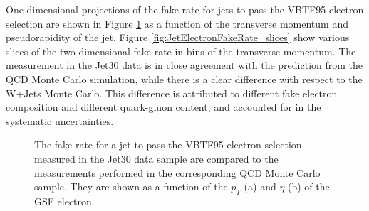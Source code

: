 \documentclass{cmspaper}
\begin{document}
One dimensional projections of the fake rate for jets to pass the VBTF95 electron selection are shown in Figure \ref{fig:JetElectronFakeRate} as a function of the transverse momentum and pseudorapidity of the jet. Figure \ref{fig:JetElectronFakeRate_slices} show various slices of the two dimensional fake rate in bins of the transverse momentum. The measurement in the Jet30 data is in close agreement with the prediction from the QCD Monte Carlo simulation, while there is a clear difference with respect to the W+Jets Monte Carlo. This difference is attributed to different fake electron composition and different quark-gluon content, and accounted for in the systematic uncertainties.

\begin{figure}[htb]
  \begin{center}
    
    \caption{The fake rate for a jet to pass the VBTF95 electron selection measured in the Jet30 data sample are compared to the measurements performed in the corresponding QCD Monte Carlo sample. They are shown as a function of the $p_T$ (a) and $\eta$ (b) of the GSF electron. }
    \label{fig:JetElectronFakeRate}
  \end{center}
\end{figure}
\end{document}
